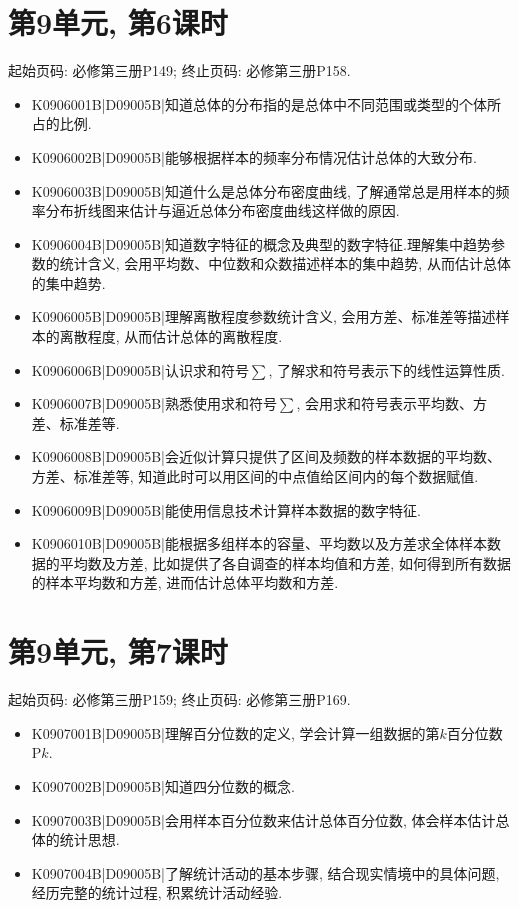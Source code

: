 \section*{第9单元, 第6课时}
起始页码: 必修第三册P149; 终止页码: 必修第三册P158.
\begin{itemize}
\item K0906001B|D09005B|知道总体的分布指的是总体中不同范围或类型的个体所占的比例.
\item K0906002B|D09005B|能够根据样本的频率分布情况估计总体的大致分布.
\item K0906003B|D09005B|知道什么是总体分布密度曲线, 了解通常总是用样本的频率分布折线图来估计与逼近总体分布密度曲线这样做的原因.
\item K0906004B|D09005B|知道数字特征的概念及典型的数字特征.理解集中趋势参数的统计含义, 会用平均数、中位数和众数描述样本的集中趋势, 从而估计总体的集中趋势.
\item K0906005B|D09005B|理解离散程度参数统计含义, 会用方差、标准差等描述样本的离散程度, 从而估计总体的离散程度.
\item K0906006B|D09005B|认识求和符号$\sum$, 了解求和符号表示下的线性运算性质.
\item K0906007B|D09005B|熟悉使用求和符号$\sum$, 会用求和符号表示平均数、方差、标准差等.
\item K0906008B|D09005B|会近似计算只提供了区间及频数的样本数据的平均数、方差、标准差等, 知道此时可以用区间的中点值给区间内的每个数据赋值.
\item K0906009B|D09005B|能使用信息技术计算样本数据的数字特征.
\item K0906010B|D09005B|能根据多组样本的容量、平均数以及方差求全体样本数据的平均数及方差, 比如提供了各自调查的样本均值和方差, 如何得到所有数据的样本平均数和方差, 进而估计总体平均数和方差.
\end{itemize}

\section*{第9单元, 第7课时}
起始页码: 必修第三册P159; 终止页码: 必修第三册P169.
\begin{itemize}
\item K0907001B|D09005B|理解百分位数的定义, 学会计算一组数据的第$k$百分位数P$k$.
\item K0907002B|D09005B|知道四分位数的概念.
\item K0907003B|D09005B|会用样本百分位数来估计总体百分位数, 体会样本估计总体的统计思想.
\item K0907004B|D09005B|了解统计活动的基本步骤, 结合现实情境中的具体问题, 经历完整的统计过程, 积累统计活动经验.
\end{itemize}

